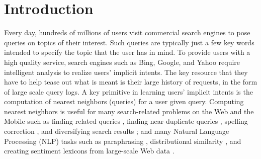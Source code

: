 
 \section{Introduction}
Every day, 
hundreds of millions of users visit commercial search engines to pose
queries on topics of their interest.  
Such queries are typically just a few key words intended to specify
the topic that the user has in mind. 
To provide users with a high quality service, 
search engines such as Bing, Google, and Yahoo require
intelligent analysis to realize users' implicit intents.
The key resource that they have to help tease out what is meant is
their large history of requests, in the form of large scale query logs.  
A key primitive in 
learning users' implicit intents is the computation of 
nearest neighbors (queries) for a user given query. 
Computing nearest neighbors is useful for 
many search-related problems on the Web and the Mobile such as 
finding related queries \cite{Jones06WWW,Jain11SIGIR,Song12WSDM}, 
finding near-duplicate queries \cite{leeCIKM11}, spelling correction \cite{ahmadEMNLP05,liSIGIR12},  
and diversifying search results \cite{Song11SIGIR}; and many Natural Language Processing (NLP) tasks   
such as paraphrasing \cite{petrovicNAACL12,ganitkevitch13Paraphrase}, 
distributional similarity \cite{ravichandran05,agirre09,turneyVector10}, and creating sentiment lexicons from large-scale Web data \cite{velikovich10}.   

